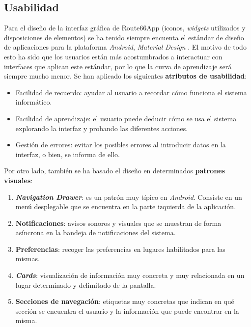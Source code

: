 \documentclass[twoside]{report}
\begin{document}
\subsection{Usabilidad}
\label{usabilitymatters}

Para el diseño de la interfaz gráfica de Route66App (iconos, \textit{widgets} utilizados y disposiciones de elementos) se ha tenido siempre encuenta el estándar de diseño de aplicaciones para la plataforma \textit{Android}, 	\textit{Material Design} \cite{materialil} \cite{materialdocs}. El motivo de todo esto ha sido que los usuarios están más acostumbrados a interactuar con interfaces que aplican este estándar, por lo que la curva de aprendizaje será siempre mucho menor. Se han aplicado los siguientes \textbf{atributos de usabilidad}:

\begin{itemize}
\item Facilidad de recuerdo: ayudar al usuario a recordar cómo funciona el sistema informático.
\item Facilidad de aprendizaje: el usuario puede deducir cómo se usa el sistema explorando la interfaz y probando las diferentes acciones.
\item Gestión de errores: evitar los posibles errores al introducir datos en la interfaz, o bien, se informa de ello.
\end{itemize}

Por otro lado, también se ha basado el diseño en determinados \textbf{patrones visuales}:
\begin{enumerate}
	\item \textbf{\textit{Navigation Drawer}}: es un patrón muy típico en \textit{Android}. Consiste en un menú desplegable que se encuentra en la parte izquierda de la aplicación.
	\item \textbf{Notificaciones}: avisos sonoros y visuales que se muestran de forma asíncrona en la bandeja de notificaciones del sistema.
	\item \textbf{Preferencias}: recoger las preferencias en lugares habilitados para las mismas.
	\item \textbf{\textit{Cards}}: visualización de información muy concreta y muy relacionada en un lugar determinado y delimitado de la pantalla.
	\item \textbf{Secciones de navegación}: etiquetas muy concretas que indican en qué sección se encuentra el usuario y la información que puede encontrar en la misma.
\end{enumerate}
\end{document}
